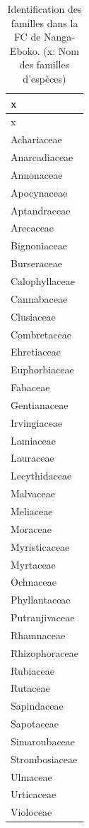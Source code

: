 \documentclass[
  12pt,
  a4paper,
  extrafontsizes,
  onecolumn,
  openright]{book}
\theoremstyle{definition}
\theoremstyle{definition}
\theoremstyle{definition}
\theoremstyle{definition}
\theoremstyle{remark}
\begin{document}
\begin{longtable}[]{@{}l@{}}
\caption{\label{tab:FamillesNanga-Eboko3}Identification des familles dans la FC de Nanga-Eboko. (x: Nom des familles d'espèces)}\tabularnewline
\toprule()
x \\
\midrule()
\endfirsthead
\toprule()
x \\
\midrule()
\endhead
Achariaceae \\
Anarcadiaceae \\
Annonaceae \\
Apocynaceae \\
Aptandraceae \\
Arecaceae \\
Bignoniaceae \\
Burseraceae \\
Calophyllaceae \\
Cannabaceae \\
Clusiaceae \\
Combretaceae \\
Ehretiaceae \\
Euphorbiaceae \\
Fabaceae \\
Gentianaceae \\
Irvingiaceae \\
Lamiaceae \\
Lauraceae \\
Lecythidaceae \\
Malvaceae \\
Meliaceae \\
Moraceae \\
Myristicaceae \\
Myrtaceae \\
Ochnaceae \\
Phyllantaceae \\
Putranjivaceae \\
Rhamnaceae \\
Rhizophoraceae \\
Rubiaceae \\
Rutaceae \\
Sapindaceae \\
Sapotaceae \\
Simaroubaceae \\
Strombosiaceae \\
Ulmaceae \\
Urticaceae \\
Violoceae \\
\bottomrule()
\end{longtable}
\end{document}
